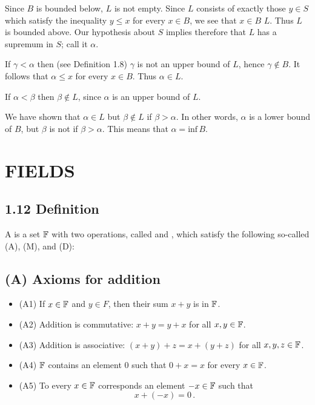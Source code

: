 \begin{list}{}{\leftmargin=\parindent\rightmargin=0pt}
\item {} Since $B$ is bounded below, $L$ is not empty. Since $L$ consists of exactly those $y \in S$ which satisfy the inequality $y \leq x$ for every $x \in B$, we see that  $x \in B$  $L$. Thus $L$ is bounded above. 
Our hypothesis about $S$ implies therefore that $L$ has a supremum in $S$; call it $\alpha$.

If $\gamma < \alpha$  then (see Definition 1.8) $\gamma$ is not an upper bound of $L$, hence $\gamma \notin B$. It follows that 
$\alpha \leq x$ for every $x \in B$. Thus $\alpha \in L$. 

If $\alpha < \beta$ then $\beta \notin L$, since $\alpha$ is an upper bound of $L$. 

We have shown that $\alpha \in L$ but $\beta \notin L$ if $\beta > \alpha$. In other words, $\alpha$ is a lower bound of $B$, but $\beta$ is not if $\beta > \alpha$. This means that $\alpha = \text{inf}\,B$.       
\end{list}


\section*{FIELDS}

\subsection*{1.12 Definition}
A  is a set $\mathbb{F}$ with two operations, called  and , which satisfy the following so-called  (A), (M), and (D):

\subsection*{(A)  Axioms for addition}
\begin{itemize}
\item[] (A1) If $x \in \mathbb{F}$ and $y \in F$, then their sum $x + y$ is in $\mathbb{F}$.
\item[] (A2) Addition is commutative: $x + y = y + x$ for all $x, y \in \mathbb{F}$. 
\item[] (A3) Addition is associative: $(x + y) + z = x + (y + z)$ for all $x, y, z \in \mathbb{F}$.
\item[] (A4) $\mathbb{F}$ contains an element $0$ such that $0 + x = x$ for every $x \in \mathbb{F}$. 
\item[] (A5) To every $x \in \mathbb{F}$ corresponds an element $-x \in \mathbb{F}$ such that $$x + (-x) = 0\,.$$
\end{itemize}

